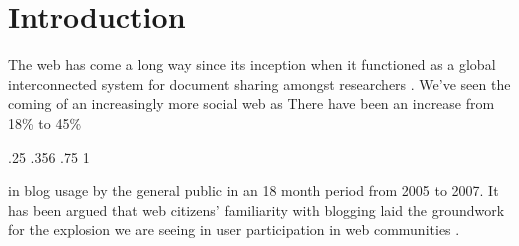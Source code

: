\chapter{Introduction}

%
%

The web has come a long way since its inception when it functioned as a
global interconnected system for document sharing amongst researchers
\citep[]{bernerslee92}. We've
seen the coming of an increasingly more social web as
There have been
an increase from 18\% to 45\%
\begin{sparkline}{3}
  \sparkspike .25  .356
  \sparkspike .75  1
\end{sparkline}
in blog usage by the general public%
in an 18 month period from 2005 to 2007.
It has been argued that web citizens'
familiarity with blogging laid the groundwork for the explosion we are seeing
in user participation in web communities
.

